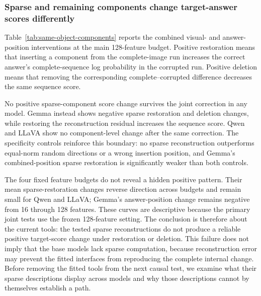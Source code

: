 \subsubsection{Sparse and remaining components change target-answer scores differently}

Table~\ref{tab:same-object-components} reports the combined visual- and answer-position interventions at the main 128-feature budget. Positive restoration means that inserting a component from the complete-image run increases the correct answer's complete-sequence log probability in the corrupted run. Positive deletion means that removing the corresponding complete--corrupted difference decreases the same sequence score.



No positive sparse-component score change survives the joint correction in any model. Gemma instead shows negative sparse restoration and deletion changes, while restoring the reconstruction residual increases the sequence score. Qwen and LLaVA show no component-level change after the same correction. The specificity controls reinforce this boundary: no sparse reconstruction outperforms equal-norm random directions or a wrong insertion position, and Gemma's combined-position sparse restoration is significantly weaker than both controls.

The four fixed feature budgets do not reveal a hidden positive pattern. Their mean sparse-restoration changes reverse direction across budgets and remain small for Qwen and LLaVA; Gemma's answer-position change remains negative from 16 through 128 features. These curves are descriptive because the primary joint tests use the frozen 128-feature setting. The conclusion is therefore about the current tools: the tested sparse reconstructions do not produce a reliable positive target-score change under restoration or deletion. This failure does not imply that the base models lack sparse computation, because reconstruction error may prevent the fitted interfaces from reproducing the complete internal change. Before removing the fitted tools from the next causal test, we examine what their sparse descriptions display across models and why those descriptions cannot by themselves establish a path.

\FloatBarrier
